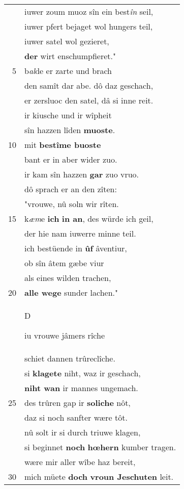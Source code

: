 \documentclass[8pt,a4paper,notitlepage]{article}
\begin{document}
\begin{table}[ht]
\begin{minipage}[t]{0.5\linewidth}
\begin{center}
\end{center}
\begin{tabular}{rl}
 & iuwer zoum muoz sîn ein best\textit{în} seil,\\ 
 & iuwer pfert bejaget wol hungers teil,\\ 
 & iuwer satel wol gezieret,\\ 
 & \textbf{der} wirt enschumpfieret."\\ 
5 & b\textit{al}de er zarte und brach\\ 
 & den samît dar abe. dô daz geschach,\\ 
 & er zersluoc den satel, dâ si inne reit.\\ 
 & ir kiusche und ir wîpheit\\ 
 & sîn hazzen lîden \textbf{muoste}.\\ 
10 & mit \textbf{bestîme buoste}\\ 
 & bant er in aber wider zuo.\\ 
 & ir kam sîn hazzen \textbf{gar} zuo vruo.\\ 
 & dô sprach er an den zîten:\\ 
 & "vrouwe, nû soln wir rîten.\\ 
15 & k\textit{æm}e \textbf{ich} \textbf{in an}, des würde ich geil,\\ 
 & der hie nam iuwerre minne teil.\\ 
 & ich bestüende in \textbf{ûf} âventiur,\\ 
 & ob sîn âtem gæbe viur\\ 
 & als eines wilden trachen,\\ 
20 & \textbf{alle wege} sunder lachen."\\ 
 & \begin{large}D\end{large}iu vrouwe jâmers rîche\\ 
 & schiet dannen trûreclîche.\\ 
 & si \textbf{klagete} niht, waz ir geschach,\\ 
 & \textbf{niht wan} ir mannes ungemach.\\ 
25 & des trûren gap ir \textbf{soliche} nôt,\\ 
 & daz si noch sanfter wære tôt.\\ 
 & nû solt ir si durch triuwe klagen,\\ 
 & si beginnet \textbf{noch} \textbf{hœhern} kumber tragen.\\ 
 & wære mir aller wîbe haz bereit,\\ 
30 & mich müete \textbf{doch} \textbf{vroun Jeschuten} leit.\\ 

\end{tabular}
\end{minipage}
\end{table}
\end{document}
